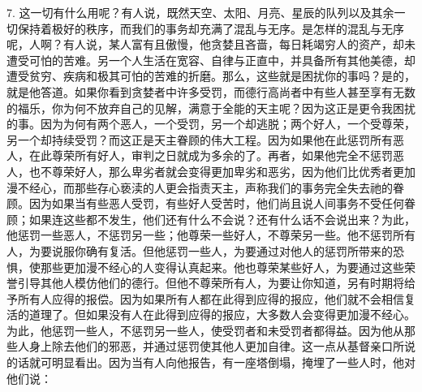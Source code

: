 7. 这一切有什么用呢？有人说，既然天空、太阳、月亮、星辰的队列以及其余一切保持着极好的秩序，而我们的事务却充满了混乱与无序。是怎样的混乱与无序呢，人啊？有人说，某人富有且傲慢，他贪婪且吝啬，每日耗竭穷人的资产，却未遭受可怕的苦难。另一个人生活在宽容、自律与正直中，并具备所有其他美德，却遭受贫穷、疾病和极其可怕的苦难的折磨。那么，这些就是困扰你的事吗？是的，就是他答道。如果你看到贪婪者中许多受罚，而德行高尚者中有些人甚至享有无数的福乐，你为何不放弃自己的见解，满意于全能的天主呢？因为这正是更令我困扰的事。因为为何有两个恶人，一个受罚，另一个却逃脱；两个好人，一个受尊荣，另一个却持续受罚？而这正是天主眷顾的伟大工程。因为如果他在此惩罚所有恶人，在此尊荣所有好人，审判之日就成为多余的了。再者，如果他完全不惩罚恶人，也不尊荣好人，那么卑劣者就会变得更加卑劣和恶劣，因为他们比优秀者更加漫不经心，而那些存心亵渎的人更会指责天主，声称我们的事务完全失去祂的眷顾。因为如果当有些恶人受罚，有些好人受苦时，他们尚且说人间事务不受任何眷顾；如果连这些都不发生，他们还有什么不会说？还有什么话不会说出来？为此，他惩罚一些恶人，不惩罚另一些；他尊荣一些好人，不尊荣另一些。他不惩罚所有人，为要说服你确有复活。但他惩罚一些人，为要通过对他人的惩罚所带来的恐惧，使那些更加漫不经心的人变得认真起来。他也尊荣某些好人，为要通过这些荣誉引导其他人模仿他们的德行。但他不尊荣所有人，为要让你知道，另有时期将给予所有人应得的报偿。因为如果所有人都在此得到应得的报应，他们就不会相信复活的道理了。但如果没有人在此得到应得的报应，大多数人会变得更加漫不经心。为此，他惩罚一些人，不惩罚另一些人，使受罚者和未受罚者都得益。因为他从那些人身上除去他们的邪恶，并通过惩罚使其他人更加自律。这一点从基督亲口所说的话就可明显看出。因为当有人向他报告，有一座塔倒塌，掩埋了一些人时，他对他们说：\par

